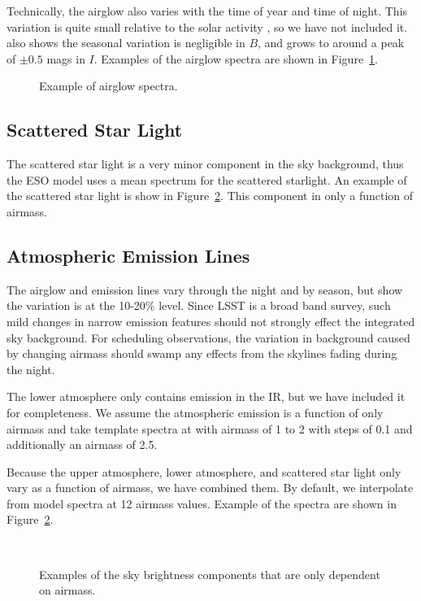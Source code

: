 \documentclass[]{spie}
\begin{document}
Technically, the airglow also varies with the time of year and time of night.  This variation is quite small relative to the solar activity \citep{Noll12}, so we have not included it.  \citet{Patat08} also shows the seasonal variation is negligible in $B$, and grows to around a peak of $\pm0.5$ mags in $I$. Examples of the airglow spectra are shown in Figure~\ref{fig:airglow}.

\begin{figure}
  \caption{Example of airglow spectra. \label{fig:airglow}}
\end{figure}

  

\subsection{Scattered Star Light}

The scattered star light is a very minor component in the sky background, thus the ESO model uses a mean spectrum for the scattered starlight.  An example of the scattered star light is show in Figure~\ref{fig:merged}. This component in only a function of airmass.


\subsection{Atmospheric Emission Lines}

The airglow and emission lines vary through the night and by season, but \citet{Noll12} show the variation is at the 10-20\% level.  Since LSST is a broad band survey, such mild changes in narrow emission features should not strongly effect the integrated sky background.  For scheduling observations, the variation in background caused by changing airmass should swamp any effects from the skylines fading during the night.

The lower atmosphere only contains emission in the IR, but we have included it for completeness.  We assume the atmospheric emission is a function of only airmass and take template spectra at with airmass of 1 to 2 with steps of 0.1 and additionally an airmass of 2.5.

Because the upper atmosphere, lower atmosphere, and scattered star light only vary as a function of airmass, we have combined them. By default, we interpolate from model spectra at 12 airmass values.  Example of the spectra are shown in Figure~\ref{fig:merged}.


\begin{figure}
   \\
  \caption{Examples of the sky brightness components that are only dependent on airmass. \label{fig:merged}}
\end{figure}
\end{document}
